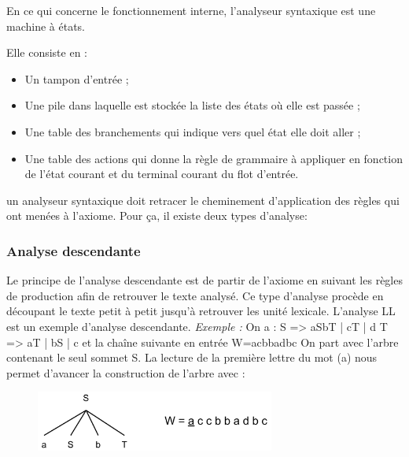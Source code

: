 \documentclass{article}
\begin{document}
En ce qui concerne le fonctionnement interne, l'analyseur syntaxique est une machine à états. 

Elle consiste en :
\begin{itemize}
    \item Un tampon d'entrée ;
    \item Une pile dans laquelle est stockée la liste des états où elle est passée ;
    \item Une table des branchements qui indique vers quel état elle doit aller ;
    \item Une table des actions qui donne la règle de grammaire à appliquer en fonction de l'état courant et du terminal courant du flot d'entrée.
\end{itemize}

un analyseur syntaxique doit retracer le cheminement d’application des règles qui ont menées à l’axiome. Pour ça, il existe deux types d’analyse:

\subsubsection{Analyse descendante}\label{sec:analyseDes}
Le principe de l’analyse descendante est de partir de l’axiome en suivant les règles de production afin de retrouver le texte analysé. Ce type d’analyse procède en découpant le texte petit à petit jusqu'à retrouver les unité lexicale. L’analyse LL est un exemple d’analyse descendante.\newline
\textit{Exemple :}\newline
On a :\newline
S => aSbT | cT | d\newline
T => aT | bS | c \newline
et la chaîne suivante en entrée W=acbbadbc\newline
On part avec l'arbre contenant le seul sommet S.
La lecture de la première lettre du mot (a) nous permet d'avancer la construction de l'arbre avec :

\begin{figure}[h]
	\centering
		\includegraphics[width=0.70\textwidth]{AnalyseDescendante1.png}
	\label{fig:AnalyseDescendante1}
\end{figure}\FloatBarrier
\end{document}

